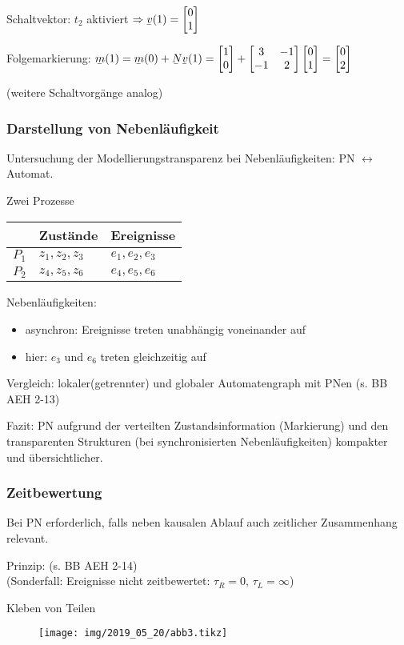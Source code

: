 Schaltvektor: $t_2$ aktiviert $\Rightarrow \ubar{v}(1)=\m{0\\1}$

Folgemarkierung: $\ubar{m}(1)=\ubar{m}(0) + \ubar{N} \ubar{v}(1) = \m{1\\0}+\m{3&-1\\-1&2} \m{0\\1} = \m{0\\2}$

(weitere Schaltvorgänge analog)

\subsubsection{Darstellung von Nebenläufigkeit}
Untersuchung der Modellierungstransparenz bei Nebenläufigkeiten: PN $\leftrightarrow$ Automat.

\beispiel Zwei Prozesse

\begin{tabular}{l|l|l}
	 & Zustände & Ereignisse \\
	 \hline
	 $P_1$ & $z_1,z_2,z_3$ & $e_1,e_2,e_3$ \\
	 \hline
	 $P_2$ & $z_4,z_5,z_6$ & $e_4,e_5,e_6$ 
\end{tabular}

Nebenläufigkeiten: 
\begin{itemize}
	\item asynchron: Ereignisse treten unabhängig voneinander auf
	\item hier: $e_3$ und $e_6$ treten gleichzeitig auf
\end{itemize}

Vergleich: lokaler(getrennter) und globaler Automatengraph mit PNen (s. BB AEH 2-13)

Fazit: PN aufgrund der verteilten Zustandsinformation (Markierung) und den transparenten Strukturen (bei synchronisierten Nebenläufigkeiten) kompakter und übersichtlicher.

\subsubsection{Zeitbewertung}
Bei PN erforderlich, falls neben kausalen Ablauf auch zeitlicher Zusammenhang relevant. 

Prinzip: (s. BB AEH 2-14)\\
(Sonderfall: Ereignisse nicht zeitbewertet: $\tau_R=0$, $\tau_L=\infty$)

\beispiel Kleben von Teilen

\begin{figure}[H]
	\centering
	\texttt{[image: img/2019\_05\_20/abb3.tikz]}
\end{figure}

